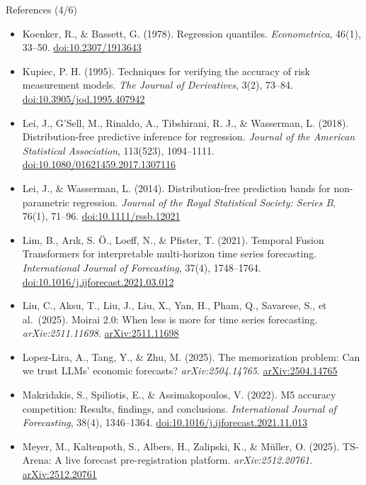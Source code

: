 \begin{frame}{References (4/6)}
\itemsize{\tiny}
\begin{itemize}
    \item Koenker, R., \& Bassett, G. (1978). Regression quantiles. \textit{Econometrica}, 46(1), 33--50. \href{https://doi.org/10.2307/1913643}{doi:10.2307/1913643}
    \item Kupiec, P. H. (1995). Techniques for verifying the accuracy of risk measurement models. \textit{The Journal of Derivatives}, 3(2), 73--84. \href{https://doi.org/10.3905/jod.1995.407942}{doi:10.3905/jod.1995.407942}
    \item Lei, J., G'Sell, M., Rinaldo, A., Tibshirani, R. J., \& Wasserman, L. (2018). Distribution-free predictive inference for regression. \textit{Journal of the American Statistical Association}, 113(523), 1094--1111. \href{https://doi.org/10.1080/01621459.2017.1307116}{doi:10.1080/01621459.2017.1307116}
    \item Lei, J., \& Wasserman, L. (2014). Distribution-free prediction bands for non-parametric regression. \textit{Journal of the Royal Statistical Society: Series B}, 76(1), 71--96. \href{https://doi.org/10.1111/rssb.12021}{doi:10.1111/rssb.12021}
    \item Lim, B., Arık, S. Ö., Loeff, N., \& Pfister, T. (2021). Temporal Fusion Transformers for interpretable multi-horizon time series forecasting. \textit{International Journal of Forecasting}, 37(4), 1748--1764. \href{https://doi.org/10.1016/j.ijforecast.2021.03.012}{doi:10.1016/j.ijforecast.2021.03.012}
    \item Liu, C., Aksu, T., Liu, J., Liu, X., Yan, H., Pham, Q., Savarese, S., et al.\ (2025). Moirai 2.0: When less is more for time series forecasting. \textit{arXiv:2511.11698}. \href{https://arxiv.org/abs/2511.11698}{arXiv:2511.11698}
    \item Lopez-Lira, A., Tang, Y., \& Zhu, M. (2025). The memorization problem: Can we trust LLMs' economic forecasts? \textit{arXiv:2504.14765}. \href{https://arxiv.org/abs/2504.14765}{arXiv:2504.14765}
    \item Makridakis, S., Spiliotis, E., \& Assimakopoulos, V. (2022). M5 accuracy competition: Results, findings, and conclusions. \textit{International Journal of Forecasting}, 38(4), 1346--1364. \href{https://doi.org/10.1016/j.ijforecast.2021.11.013}{doi:10.1016/j.ijforecast.2021.11.013}
    \item Meyer, M., Kaltenpoth, S., Albers, H., Zalipski, K., \& Müller, O. (2025). TS-Arena: A live forecast pre-registration platform. \textit{arXiv:2512.20761}. \href{https://arxiv.org/abs/2512.20761}{arXiv:2512.20761}

\end{itemize}
\end{frame}
